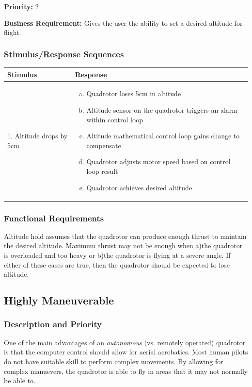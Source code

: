 \documentclass[english]{article}
\numberwithin{equation}{section} %
\begin{document}
\textbf{Priority:} 2

\textbf{Business Requirement:} Gives the user the ability to set a desired altitude for flight.

\subsubsection{Stimulus/Response Sequences}

\begin{tabular}{p{3cm} | p{8.5cm}}
\hline
\textbf{Stimulus} & \textbf{Response}\\
\hline
1. Altitude drops by 5cm &
\begin{enumerate}[(a)]\itemsep1pt %
\item Quadrotor loses 5cm in altitude
\item Altitude sensor on the quadrotor triggers an alarm within control loop
\item Altitude mathematical control loop gains change to compensate
\item Quadrotor adjusts motor speed based on control loop result
\item Quadrotor achieves desired altitude
\end{enumerate}
\\ 
\hline
\end{tabular}
\subsubsection{Functional Requirements}
Altitude hold assumes that the quadrotor can produce enough thrust to maintain the desired altitude. Maximum thrust may not be enough when a)the quadrotor is overloaded and too heavy or b)the quadrotor is flying at a severe angle. If either of these cases are true, then the quadrotor should be expected to lose altitude.
\bigskip
\subsection{Highly Maneuverable}
\subsubsection{Description and Priority}
One of the main advantages of an \textit{autonomous} (vs. remotely operated) quadrotor is that the computer control should allow for aerial acrobatics. Most human pilots do not have suitable skill to perform complex movements. By allowing for complex manuevers, the quadrotor is able to fly in areas that it may not normally be able to.
\end{document}
